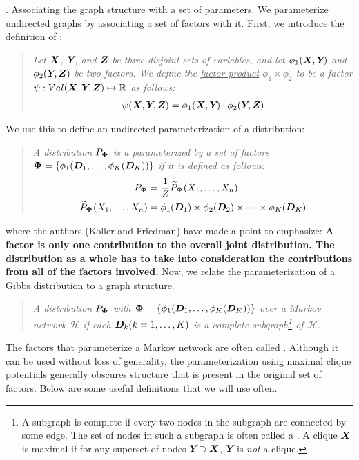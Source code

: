 \documentclass[11pt]{article}
\begin{document}
\myspace
\p {}. Associating the graph structure with a set of parameters. We parameterize undirected graphs by associating a set of factors with it. First, we introduce the definition of :
\vspace{-0.5em}
\begin{quote}
	{\itshape Let $\matr{X}$, $\matr{Y}$, and $\matr Z$ be three disjoint sets of variables, and let $\phi_1(\matr X, \matr Y)$ and $\phi_2(\matr Y, \matr Z)$ be two factors. We define the \underline{factor product} $\phi_1 \times \phi_2$ to be a factor $\psi: Val(\matr X, \matr Y, \matr Z) \mapsto \R$ as follows:
		\begin{align}
			\psi(\matr X, \matr Y, \matr Z) = \phi_1(\matr X, \matr Y) \cdot \phi_2(\matr Y, \matr Z)
		\end{align}
	}
\end{quote}
We use this to define an undirected parameterization of a distribution:
\vspace{-1em}
\begin{quote}
	{\itshape A distribution $P_{\matr{\Phi}}$ is a  parameterized by a set of factors $\matr{\Phi} = \{\phi_1(\matr[1]{D}, \ldots, \phi_K(\matr[K]{D}) )\}$ if it is defined as follows:
		\begin{align}
			P_{\matr{\Phi}} &= \inv{Z} \widetilde{P}_{\matr{\Phi}}(X_1, \ldots, X_n) \\
			 \widetilde{P}_{\matr{\Phi}}(X_1, \ldots, X_n) &= \phi_1(\matr[1]{D}) \times \phi_2(\matr[2]{D}) \times \cdots \times \phi_K(\matr[K]{D})
		\end{align}
	}
\end{quote}
where the authors (Koller and Friedman) have made a point to emphasize: \textbf{A factor is only one contribution to the overall joint distribution. The distribution as a whole has to take into consideration the contributions from all of the factors involved.} Now, we relate the parameterization of a Gibbs distribution to a graph structure.
\vspace{-0.5em}
\begin{quote}
	{\itshape A distribution $P_{\matr{\Phi}}$ with $\matr{\Phi} = \{\phi_1(\matr[1]{D}, \ldots, \phi_K(\matr[K]{D}) )\}$  over a Markov network $\mathcal{H}$ if each $\matr[k]{D} (k = 1, \ldots, K)$ is a complete subgraph\footnote{A subgraph is complete if every two nodes in the subgraph are connected by some edge. The set of nodes in such a subgraph is often called a . A clique $\matr{X}$ is maximal if for any superset of nodes $\matr{Y} \supset \matr{X}$, $\matr{Y}$ is \textit{not} a clique.} of $\mathcal{H}$.
	}
\end{quote}
The factors that parameterize a Markov network are often called . Although it can be used without loss of generality, the parameterization using maximal clique potentials generally obscures structure that is present in the original set of factors. Below are some useful definitions that we will use often. \\
\end{document}
